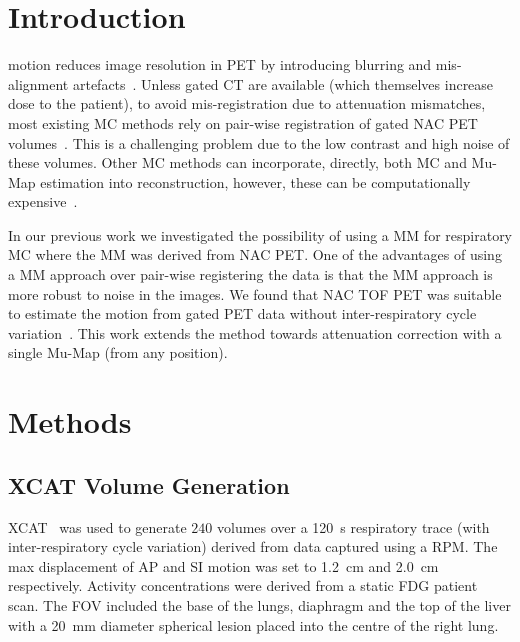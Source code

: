 \section{Introduction} \label{sec:introduction}
     motion reduces image resolution in \gls{PET} by introducing blurring and mis-alignment artefacts~\cite{Nehmeh2008a}. Unless gated \gls{CT} are available (which themselves increase dose to the patient), to avoid mis-registration due to attenuation mismatches, most existing \gls{MC} methods rely on pair-wise registration of gated \gls{NAC} \gls{PET} volumes~\cite{LungMotionDiaphragmBaiBib, Oliveira2014}. This is a challenging problem due to the low contrast and high noise of these volumes. Other \gls{MC} methods can incorporate, directly, both \gls{MC} and \gls{Mu-Map} estimation into reconstruction, however, these can be computationally expensive~\cite{Bousse2016b}.
    
    In our previous work we investigated the possibility of using a \gls{MM} for respiratory \gls{MC} where the \gls{MM} was derived from \gls{NAC} \gls{PET}. One of the advantages of using a \gls{MM} approach over pair-wise registering the data is that the \gls{MM} approach is more robust to noise in the images. We found that \gls{NAC} \gls{TOF} \gls{PET} was suitable to estimate the motion from gated PET data without inter-respiratory cycle variation~\cite{Whitehead2019ImpactPET}. This work extends the method towards attenuation correction with a single \gls{Mu-Map} (from any position).


\section{Methods} \label{sec:methods}
    
    \subsection{XCAT Volume Generation} \label{sec:xcat_volume_generation}
        \gls{XCAT}~\cite{Segars2010} was used to generate $240$ volumes over a \SI{120}{\second} respiratory trace (with inter-respiratory cycle variation) derived from data captured using a \gls{RPM}. The max displacement of \gls{AP} and \gls{SI} motion was set to \SI{1.2}{\centi\metre} and \SI{2.0}{\centi\metre} respectively. Activity concentrations were derived from a static \gls{FDG} patient scan. The \gls{FOV} included the base of the lungs, diaphragm and the top of the liver with a \SI{20}{\milli\metre} diameter spherical lesion placed into the centre of the right lung.
    
